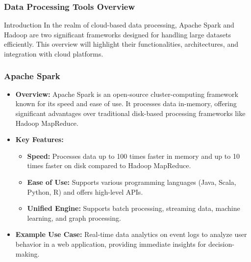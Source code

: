 \documentclass{beamer}
\begin{document}
\begin{frame}[fragile]
    \frametitle{Data Processing Tools Overview}
    \begin{block}{Introduction}
        In the realm of cloud-based data processing, Apache Spark and Hadoop are two significant frameworks designed for handling large datasets efficiently. This overview will highlight their functionalities, architectures, and integration with cloud platforms.
    \end{block}
\end{frame}

\begin{frame}[fragile]
    \frametitle{Apache Spark}
    \begin{itemize}
        \item \textbf{Overview:} 
            Apache Spark is an open-source cluster-computing framework known for its speed and ease of use. It processes data in-memory, offering significant advantages over traditional disk-based processing frameworks like Hadoop MapReduce.
        
        \item \textbf{Key Features:}
            \begin{itemize}
                \item \textbf{Speed:} Processes data up to 100 times faster in memory and up to 10 times faster on disk compared to Hadoop MapReduce.
                \item \textbf{Ease of Use:} Supports various programming languages (Java, Scala, Python, R) and offers high-level APIs.
                \item \textbf{Unified Engine:} Supports batch processing, streaming data, machine learning, and graph processing.
            \end{itemize}
        
        \item \textbf{Example Use Case:} 
            Real-time data analytics on event logs to analyze user behavior in a web application, providing immediate insights for decision-making.
    \end{itemize}
\end{frame}
\end{document}
